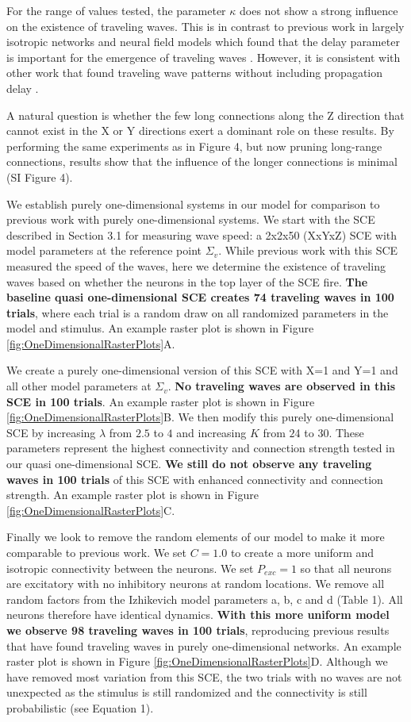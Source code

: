 For the range of values tested, the parameter $\kappa$ does not show a strong influence on the existence of traveling waves. 
This is in contrast to previous work in largely isotropic networks and neural field models which found that the delay parameter is important for the emergence of traveling waves \citet{Senk2020}\citet{Atay2006}\citet{Roxin2005}.
However, it is consistent with other work that found traveling wave patterns without including propagation delay \citet{Folias2012}\citet{Wyller2007}.

A natural question is whether the few long connections along the Z direction that cannot exist in the X or Y directions exert a dominant role on these results.
By performing the same experiments as in Figure 4, but now pruning long-range connections, results show that the influence of the longer connections is minimal (SI Figure 4).

We establish purely one-dimensional systems in our model for comparison to previous work with purely one-dimensional systems.
We start with the SCE described in Section 3.1 for measuring wave speed: a 2x2x50 (XxYxZ) SCE with model parameters at the reference point $\Sigma_v$. 
While previous work with this SCE measured the speed of the waves, here we determine the existence of traveling waves based on whether the neurons in the top layer of the SCE fire.
\textbf{The baseline quasi one-dimensional SCE creates 74 traveling waves in 100 trials}, where each trial is a random draw on all randomized parameters in the model and stimulus.
An example raster plot is shown in Figure \ref{fig:OneDimensionalRasterPlots}A.

We create a purely one-dimensional version of this SCE with X=1 and Y=1 and all other model parameters at $\Sigma_v$.
\textbf{No traveling waves are observed in this SCE in 100 trials}. 
An example raster plot is shown in Figure \ref{fig:OneDimensionalRasterPlots}B.
We then modify this purely one-dimensional SCE by increasing $\lambda$ from $2.5$ to $4$ and increasing $K$ from $2$4 to $30$.
These parameters represent the highest connectivity and connection strength tested in our quasi one-dimensional SCE.
\textbf{We still do not observe any traveling waves in 100 trials} of this SCE with enhanced connectivity and connection strength.
An example raster plot is shown in Figure \ref{fig:OneDimensionalRasterPlots}C.

Finally we look to remove the random elements of our model to make it more comparable to previous work.
We set $C=1.0$ to create a more uniform and isotropic connectivity between the neurons.
We set $P_{exc}=1$ so that all neurons are excitatory with no inhibitory neurons at random locations.
We remove all random factors from the Izhikevich model parameters a, b, c and d (Table 1).
All neurons therefore have identical dynamics.
\textbf{With this more uniform model we observe 98 traveling waves in 100 trials}, reproducing previous results that have found traveling waves in purely one-dimensional networks.
An example raster plot is shown in Figure \ref{fig:OneDimensionalRasterPlots}D.
Although we have removed most variation from this SCE, the two trials with no waves are not unexpected as the stimulus is still randomized and the connectivity is still probabilistic (see Equation 1).

